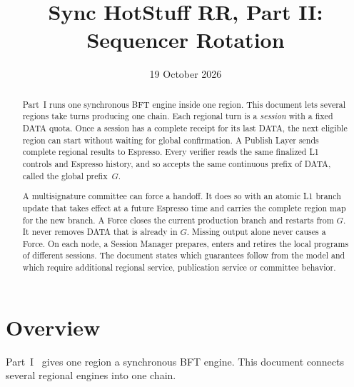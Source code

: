\documentclass[11pt,a4paper]{article}
\title{Sync HotStuff RR, Part II: Sequencer Rotation}
\author{}\date{19 October 2026}
\begin{document}
\maketitle
\begin{abstract}
Part~I runs one synchronous BFT engine inside one region. This document
lets several regions take turns producing one chain. Each regional turn
is a \emph{session} with a fixed DATA quota. Once a session has a complete
receipt for its last DATA, the next eligible region can start without waiting
for global confirmation. A Publish Layer sends complete regional results
to Espresso. Every verifier reads the same finalized L1 controls and
Espresso history, and so accepts the same continuous prefix of DATA,
called the global prefix~$G$.

A multisignature committee can force a handoff. It does so with an
atomic L1 branch update that takes effect at a future Espresso time and
carries the complete region map for the new branch.
A Force closes the current production branch and restarts from $G$.
It never removes DATA that is already in $G$. Missing output alone never
causes a Force. On each node, a Session Manager prepares, enters and
retires the local programs of different sessions. The document states
which guarantees follow from the model and which require additional
regional service, publication service or committee behavior.
\end{abstract}

\section{Overview}
\label{sec:overview}
Part~I~\cite{part1} gives one region a synchronous BFT engine.
This document connects several regional engines into one chain.
\end{document}
